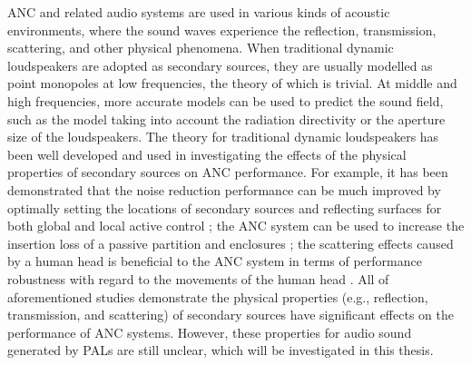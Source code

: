     ANC and related audio systems are used in various kinds of acoustic environments, where the sound waves experience the reflection, transmission, scattering, and other physical phenomena. 
    When traditional dynamic loudspeakers are adopted as secondary sources, they are usually modelled as point monopoles at low frequencies, the theory of which is trivial. 
    At middle and high frequencies, more accurate models can be used to predict the sound field, such as the model taking into account the radiation directivity or the aperture size of the loudspeakers.
    The theory for traditional dynamic loudspeakers has been well developed and used in investigating the effects of the physical properties of secondary sources on ANC performance.
    For example, it has been demonstrated that the noise reduction performance can be much improved by optimally setting the locations of secondary sources and reflecting surfaces for both global and local active control \cite{Boodoo2015ReviewEffectReflective, Tao2017PerformanceMultichannelActive, Zhong2019IncreasingPerformanceActive, Zhong2019IncreasingPerformanceActivea, Zhong2020PerformanceActiveNoise};
    the ANC system can be used to increase the insertion loss of a passive partition \cite{Sas1995ActiveControlSound, Tarabini2009ActiveControlNoisea, Zhang2017PerformanceSnoringNoise} and enclosures \cite{Dupont2009ActiveAbsorptionReduce};
    the scattering effects caused by a human head is beneficial to the ANC system in terms of performance robustness with regard to the movements of the human head \cite{Lin2004ActiveControlRadiation, Zou2008PerformanceAnalysisVirtual, Liu2018ActiveControlStrategy, Elliott2020ActiveControlSound}.
    All of aforementioned studies demonstrate the physical properties (e.g., reflection, transmission, and scattering) of secondary sources have significant effects on the performance of ANC systems.
    However, these properties for audio sound generated by PALs are still unclear, which will be investigated in this thesis.

